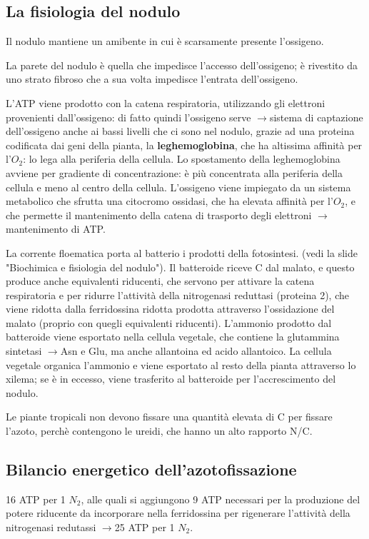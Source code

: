 \documentclass[a4paper,12pt]{book}
\newcommand{\lfreccia}{\ensuremath{\longrightarrow}}
\begin{document}
\subsection{La fisiologia del nodulo}
Il nodulo mantiene un amibente in cui è scarsamente presente l'ossigeno. 

La parete del nodulo è quella che impedisce l'accesso dell'ossigeno; è rivestito da uno strato fibroso che a sua volta impedisce l'entrata dell'ossigeno.

L'ATP viene prodotto con la catena respiratoria, utilizzando gli elettroni provenienti dall'ossigeno: di fatto quindi l'ossigeno serve \lfreccia sistema di captazione dell'ossigeno anche ai bassi livelli che ci sono nel nodulo, grazie ad una proteina codificata dai geni della pianta, la \textbf{leghemoglobina}, che ha altissima affinità per l'$O_2$: lo lega alla periferia della cellula. Lo spostamento della leghemoglobina avviene per gradiente di concentrazione: è più concentrata alla periferia della cellula e meno al centro della cellula. L'ossigeno viene impiegato da un sistema metabolico che sfrutta una citocromo ossidasi, che ha elevata affinità per l'$O_2$, e che permette il mantenimento della catena di trasporto degli elettroni \lfreccia mantenimento di ATP.

La corrente floematica porta al batterio i prodotti della fotosintesi.
(vedi la slide "Biochimica e fisiologia del nodulo").
Il batteroide riceve C dal malato, e questo produce anche equivalenti riducenti, che servono per attivare la catena respiratoria e per ridurre l'attività della nitrogenasi reduttasi (proteina 2), che viene ridotta dalla ferridossina ridotta prodotta attraverso l'ossidazione del malato (proprio con quegli equivalenti riducenti).
L'ammonio prodotto dal batteroide viene esportato nella cellula vegetale, che contiene la glutammina sintetasi \lfreccia Asn e Glu, ma anche allantoina ed acido allantoico. 
La cellula vegetale organica l'ammonio e viene esportato al resto della pianta attraverso lo xilema; se è in eccesso, viene trasferito al batteroide per l'accrescimento del nodulo. 

Le piante tropicali non devono fissare una quantità elevata di C per fissare l'azoto, perchè contengono le ureidi, che hanno un alto rapporto N/C.

\subsection{Bilancio energetico dell'azotofissazione}
16 ATP per 1 $N_{2}$, alle quali si aggiungono 9 ATP necessari per la produzione del potere riducente da incorporare nella ferridossina per rigenerare l'attività della nitrogenasi redutassi \lfreccia 25 ATP per 1 $N_{2}$.
\end{document}
